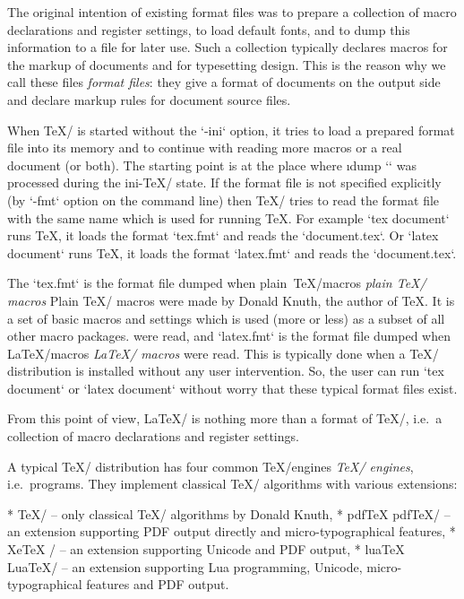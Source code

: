 The original intention of existing format files was to prepare a
collection of macro declarations and register settings, to load default fonts, and
to dump this information to a file for later use. Such a collection typically
declares macros for the markup of documents and for typesetting design. This is
the reason why we call these files {\em format files}: they give a format
of documents on the output side and declare markup rules for document source files.

When \TeX/ is started without the `-ini` option, it tries to load a prepared
format file into its memory and to continue with reading more macros or a real
document (or both). The starting point is at the place where \i dump `\dump` was
processed during the ini-\TeX/ state. If the format file is not specified
explicitly (by `-fmt` option on the command line) then \TeX/ tries to read the
format file with the same name which is used for running \TeX. For example
`tex document` runs \TeX, it loads the format `tex.fmt` and reads the
`document.tex`. Or `latex document` runs \TeX, it loads the format `latex.fmt`
and reads the `document.tex`. 

The `tex.fmt` is the format file dumped when \ii plain~TeX/macros {\em plain \TeX/ macros}\fnote
{Plain \TeX/ macros were made by  Donald Knuth, the author of \TeX. It is a
set of basic macros and settings which is used (more or less) as a subset of
all other macro packages.} 
were read, and `latex.fmt` is the format file dumped when \ii LaTeX/macros {\em \LaTeX/ macros} were read.
This is typically done when a \TeX/ distribution is installed without any user
intervention. So, the user can run `tex document` or `latex document` without
worry that these typical format files exist.

From this point of view, \LaTeX/ is nothing more than a format of \TeX/,
i.e.~a collection of macro declarations and register settings.

A typical \TeX/ distribution has four common \ii TeX/engines {\em \TeX/ engines}, i.e.~programs.
They implement classical \TeX/ algorithms with various extensions: 

\begitems
* \TeX/ -- only classical \TeX/ algorithms by Donald Knuth, 
* \ii pdfTeX pdf\TeX/ -- an extension supporting PDF output directly and
             micro-typographical features,
* \ii XeTeX \XeTeX/ -- an extension supporting Unicode and PDF output, 
* \ii luaTeX Lua\TeX/ -- an extension supporting Lua programming, Unicode,
            micro-typographical features and PDF output.
\enditems

